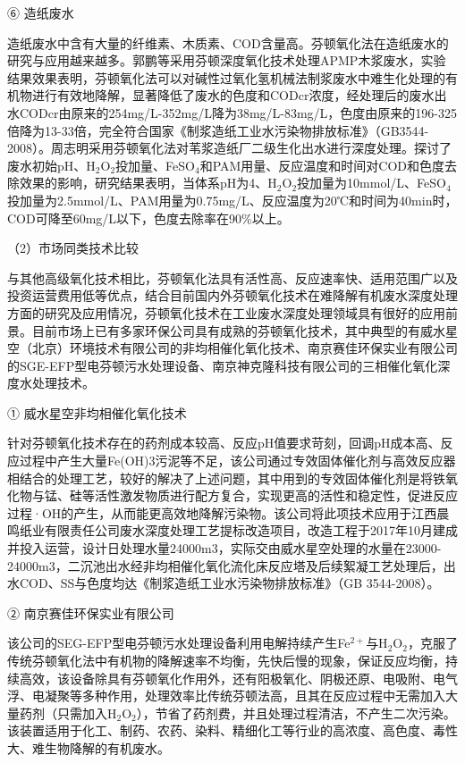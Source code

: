 ⑥ 造纸废水

造纸废水中含有大量的纤维素、木质素、COD含量高。芬顿氧化法在造纸废水的研究与应用越来越多。郭鹏\cite{guopeng_2012}等采用芬顿深度氧化技术处理APMP木浆废水，实验结果效果表明，芬顿氧化法可以对碱性过氧化氢机械法制浆废水中难生化处理的有机物进行有效地降解，显著降低了废水的色度和CODcr浓度，经处理后的废水出水CODcr由原来的254mg/L-352mg/L降为38mg/L-83mg/L，色度由原来的196-325倍降为13-33倍，完全符合国家《制浆造纸工业水污染物排放标准》（GB3544-2008）。周志明\cite{zhouzhiming_2012}采用芬顿氧化法对苇浆造纸厂二级生化出水进行深度处理。探讨了废水初始pH、H$_2$O$_2$投加量、FeSO$_4$和PAM用量、反应温度和时间对COD和色度去除效果的影响，研究结果表明，当体系pH为4、H$_2$O$_2$投加量为10mmol/L、FeSO$_4$投加量为2.5mmol/L、PAM用量为0.75mg/L、反应温度为20℃和时间为40min时，COD\linebreak[0] 可降至60mg/L以下，色度去除率在90\%以上。

（2）市场同类技术比较

与其他高级氧化技术相比，芬顿氧化法具有活性高、反应速率快、适用范围广以及投资运营费用低等优点\cite{canizares_costs_2009}，结合目前国内外芬顿氧化技术在难降解有机废水深度处理方面的研究及应用情况，芬顿氧化技术在工业废水深度处理领域具有很好的应用前景。目前市场上已有多家环保公司具有成熟的芬顿氧化技术，其中典型的有威水星空（北京）环境技术有限公司的非均相催化氧化技术、南京赛佳环保实业有限公司的SGE-EFP型电芬顿污水处理设备、南京神克隆科技有限公司的三相催化氧化深度水处理技术。

① 威水星空非均相催化氧化技术

针对芬顿氧化技术存在的药剂成本较高、反应pH值要求苛刻，回调pH成本高、反应过程中产生大量Fe(OH)3污泥等不足，该公司通过专效固体催化剂与高效反应器相结合的处理工艺，较好的解决了上述问题，其中用到的专效固体催化剂是将铁氧化物与锰、硅等活性激发物质进行配方复合，实现更高的活性和稳定性，促进反应过程·OH的产生，从而能更高效地降解污染物。该公司将此项技术应用于江西晨鸣纸业有限责任公司废水深度处理工艺提标改造项目，改造工程于2017年10月建成并投入运营，设计日处理水量24000m3，实际交由威水星空处理的水量在23000-24000m3，二沉池出水经非均相催化氧化流化床反应塔及后续絮凝工艺处理后，出水COD、SS与色度均达《制浆造纸工业水污染物排放标准》（GB 3544-2008）。

② 南京赛佳环保实业有限公司

该公司的SEG-EFP型电芬顿污水处理设备利用电解持续产生Fe$^{2+}$与H$_2$O$_2$，克服了传统芬顿氧化法中有机物的降解速率不均衡，先快后慢的现象，保证反应均衡，持续高效，该设备除具有芬顿氧化作用外，还有阳极氧化、阴极还原、电吸附、电气浮、电凝聚等多种作用，处理效率比传统芬顿法高，且其在反应过程中无需加入大量药剂（只需加入H$_2$O$_2$），节省了药剂费，并且处理过程清洁，不产生二次污染。该装置适用于化工、制药、农药、染料、精细化工等行业的高浓度、高色度、毒性大、难生物降解的有机废水。

